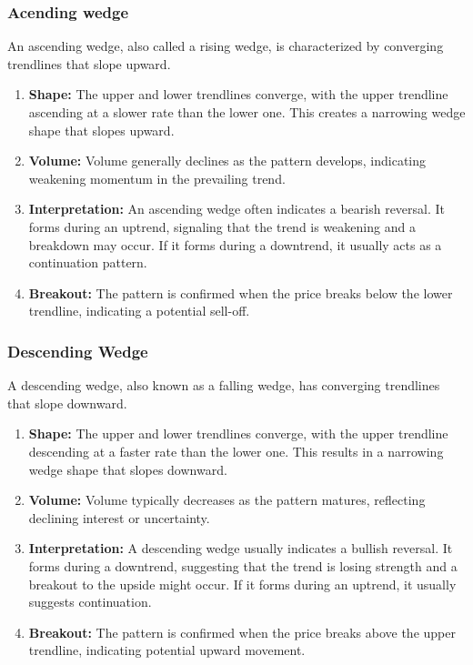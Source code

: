 \documentclass{report}
\begin{document}
     \subsubsection{Acending wedge}
     \bigbreak \noindent 
     An ascending wedge, also called a rising wedge, is characterized by converging trendlines that slope upward.
     \begin{enumerate}
         \item \textbf{Shape:} The upper and lower trendlines converge, with the upper trendline ascending at a slower rate than the lower one. This creates a narrowing wedge shape that slopes upward.
         \item \textbf{Volume:} Volume generally declines as the pattern develops, indicating weakening momentum in the prevailing trend.
         \item \textbf{Interpretation:} An ascending wedge often indicates a bearish reversal. It forms during an uptrend, signaling that the trend is weakening and a breakdown may occur. If it forms during a downtrend, it usually acts as a continuation pattern.
         \item \textbf{Breakout:} The pattern is confirmed when the price breaks below the lower trendline, indicating a potential sell-off.
     \end{enumerate}
     \bigbreak \noindent 

     \pagebreak 
     \subsubsection{Descending Wedge}
     \bigbreak \noindent 
     A descending wedge, also known as a falling wedge, has converging trendlines that slope downward.
     \begin{enumerate}
         \item \textbf{Shape:} The upper and lower trendlines converge, with the upper trendline descending at a faster rate than the lower one. This results in a narrowing wedge shape that slopes downward.
         \item \textbf{Volume:} Volume typically decreases as the pattern matures, reflecting declining interest or uncertainty.
         \item \textbf{Interpretation:} A descending wedge usually indicates a bullish reversal. It forms during a downtrend, suggesting that the trend is losing strength and a breakout to the upside might occur. If it forms during an uptrend, it usually suggests continuation.
         \item \textbf{Breakout:} The pattern is confirmed when the price breaks above the upper trendline, indicating potential upward movement.
     \end{enumerate}
\end{document}
